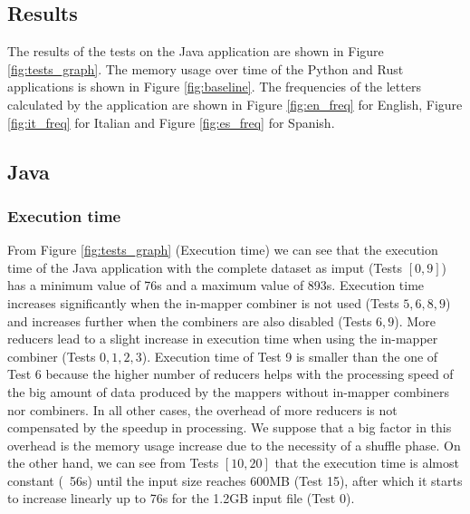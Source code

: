 \documentclass{article}
\begin{document}
\begin{multicols}{2}
\section{Results}
    The results of the tests on the Java application are shown in Figure \ref{fig:tests_graph}.
    The memory usage over time of the Python and Rust applications is shown in Figure \ref{fig:baseline}.
    The frequencies of the letters calculated by the application are shown in 
    Figure \ref{fig:en_freq} for English, Figure \ref{fig:it_freq} for Italian and 
    Figure \ref{fig:es_freq} for Spanish.
    \subsection{Java}
        \subsubsection{Execution time}
            From Figure \ref{fig:tests_graph} (Execution time) we can see that the execution time of the
            Java application with the complete dataset as imput (Tests $[0,9]$) has a minimum value of 76s and
            a maximum value of 893s.
            Execution time increases significantly when the in-mapper combiner is not used (Tests ${5,6,8,9}$)
            and increases further when the combiners are also disabled (Tests ${6,9}$).
            More reducers lead to a slight increase in execution time when using the in-mapper combiner 
            (Tests ${0,1,2,3}$). Execution time of Test 9 is smaller than the one of Test 6 because the
            higher number of reducers helps with the processing speed of the big amount of data produced 
            by the mappers without in-mapper combiners nor combiners.
            In all other cases, the overhead of more reducers is not compensated by the speedup in processing.
            We suppose that a big factor in this overhead is the memory usage increase due to the necessity of
            a shuffle phase.
            On the other hand, we can see from Tests $[10,20]$ that the execution time is almost constant
            (~56s) until the input size reaches 600MB (Test 15), after which it starts to increase linearly
            up to 76s for the 1.2GB input file (Test 0).

\end{multicols}
\end{document}

